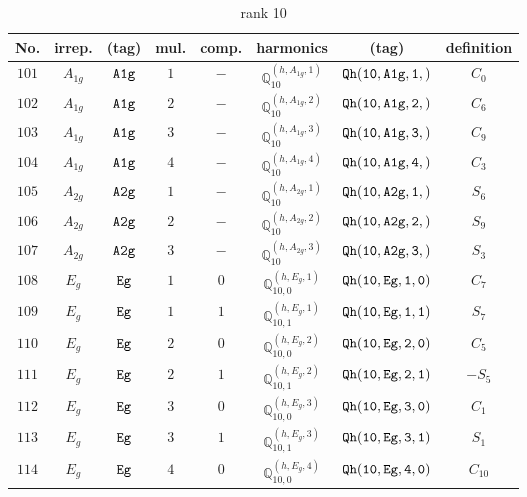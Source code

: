 \documentclass[fleqn,8pt]{jsarticle}
\begin{document}
\begin{table}[ht!]
\begin{center}
\caption{rank 10}
\renewcommand{\arraystretch}{1.3}
\begin{tabular}{cccccccc} \hline \hline
No. & irrep. & (tag) & mul. & comp. & harmonics & (tag) & definition \\ \hline
$ 101 $ & $ A_{1g} $ & $ {\tt A1g} $ & $ 1 $ & $ - $ & $ \mathbb{Q}_{10}^{(h,A_{1g},1)} $ & $ {\tt Qh(10,A1g,1,)} $ & $ C_{0} $ \\
$ 102 $ & $ A_{1g} $ & $ {\tt A1g} $ & $ 2 $ & $ - $ & $ \mathbb{Q}_{10}^{(h,A_{1g},2)} $ & $ {\tt Qh(10,A1g,2,)} $ & $ C_{6} $ \\
$ 103 $ & $ A_{1g} $ & $ {\tt A1g} $ & $ 3 $ & $ - $ & $ \mathbb{Q}_{10}^{(h,A_{1g},3)} $ & $ {\tt Qh(10,A1g,3,)} $ & $ C_{9} $ \\
$ 104 $ & $ A_{1g} $ & $ {\tt A1g} $ & $ 4 $ & $ - $ & $ \mathbb{Q}_{10}^{(h,A_{1g},4)} $ & $ {\tt Qh(10,A1g,4,)} $ & $ C_{3} $ \\
$ 105 $ & $ A_{2g} $ & $ {\tt A2g} $ & $ 1 $ & $ - $ & $ \mathbb{Q}_{10}^{(h,A_{2g},1)} $ & $ {\tt Qh(10,A2g,1,)} $ & $ S_{6} $ \\
$ 106 $ & $ A_{2g} $ & $ {\tt A2g} $ & $ 2 $ & $ - $ & $ \mathbb{Q}_{10}^{(h,A_{2g},2)} $ & $ {\tt Qh(10,A2g,2,)} $ & $ S_{9} $ \\
$ 107 $ & $ A_{2g} $ & $ {\tt A2g} $ & $ 3 $ & $ - $ & $ \mathbb{Q}_{10}^{(h,A_{2g},3)} $ & $ {\tt Qh(10,A2g,3,)} $ & $ S_{3} $ \\
$ 108 $ & $ E_{g} $ & $ {\tt Eg} $ & $ 1 $ & $ 0 $ & $ \mathbb{Q}_{10,0}^{(h,E_{g},1)} $ & $ {\tt Qh(10,Eg,1,0)} $ & $ C_{7} $ \\
$ 109 $ & $ E_{g} $ & $ {\tt Eg} $ & $ 1 $ & $ 1 $ & $ \mathbb{Q}_{10,1}^{(h,E_{g},1)} $ & $ {\tt Qh(10,Eg,1,1)} $ & $ S_{7} $ \\
$ 110 $ & $ E_{g} $ & $ {\tt Eg} $ & $ 2 $ & $ 0 $ & $ \mathbb{Q}_{10,0}^{(h,E_{g},2)} $ & $ {\tt Qh(10,Eg,2,0)} $ & $ C_{5} $ \\
$ 111 $ & $ E_{g} $ & $ {\tt Eg} $ & $ 2 $ & $ 1 $ & $ \mathbb{Q}_{10,1}^{(h,E_{g},2)} $ & $ {\tt Qh(10,Eg,2,1)} $ & $ - S_{5} $ \\
$ 112 $ & $ E_{g} $ & $ {\tt Eg} $ & $ 3 $ & $ 0 $ & $ \mathbb{Q}_{10,0}^{(h,E_{g},3)} $ & $ {\tt Qh(10,Eg,3,0)} $ & $ C_{1} $ \\
$ 113 $ & $ E_{g} $ & $ {\tt Eg} $ & $ 3 $ & $ 1 $ & $ \mathbb{Q}_{10,1}^{(h,E_{g},3)} $ & $ {\tt Qh(10,Eg,3,1)} $ & $ S_{1} $ \\
$ 114 $ & $ E_{g} $ & $ {\tt Eg} $ & $ 4 $ & $ 0 $ & $ \mathbb{Q}_{10,0}^{(h,E_{g},4)} $ & $ {\tt Qh(10,Eg,4,0)} $ & $ C_{10} $ \\

\end{tabular}
\end{center}
\end{table}
\end{document}
